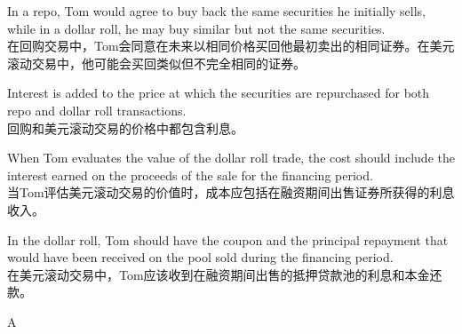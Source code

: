 \documentclass{article}
\begin{document}
    \begin{choices}
        \item In a repo, Tom would agree to buy back the same securities he initially sells, while in a dollar roll, he may buy similar but not the same securities.\\
        在回购交易中，Tom会同意在未来以相同价格买回他最初卖出的相同证券。在美元滚动交易中，他可能会买回类似但不完全相同的证券。
        \item Interest is added to the price at which the securities are repurchased for both repo and dollar roll transactions.\\
        回购和美元滚动交易的价格中都包含利息。
        \item When Tom evaluates the value of the dollar roll trade, the cost should include the interest earned on the proceeds of the sale for the financing period.\\
        当Tom评估美元滚动交易的价值时，成本应包括在融资期间出售证券所获得的利息收入。
        \item In the dollar roll, Tom should have the coupon and the principal repayment that would have been received on the pool sold during the financing period.\\
        在美元滚动交易中，Tom应该收到在融资期间出售的抵押贷款池的利息和本金还款。
    \end{choices}
    
    \begin{correctanswer}
    A
    \end{correctanswer}
    
\end{document}
